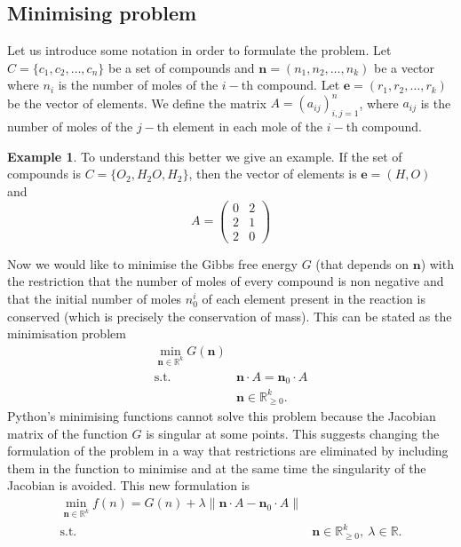 \documentclass[a4paper,10pt]{article}
\newcommand{\bm}{\boldsymbol}
\newcommand{\mR}{{\mathbb R}}
\theoremstyle{plain}
\theoremstyle{definition}
\newtheorem{ex}{Example}[section]
\theoremstyle{remark}
\begin{document}
\subsection{Minimising problem}
Let us introduce some notation in order to formulate the problem. Let $C = \{c_1,c_2,\dots,c_n\} $ be a set of compounds and $\bm n=(n_1,n_2,\dots,n_k)$ be a vector where $n_i$ is the number of moles of the $i-$th compound. Let $\bm e= (r_1,r_2,\dots,r_k)$ be the vector of elements. We define the matrix $A=(a_{ij})_{i,j=1}^n$, where $a_{ij}$ is the number of moles of the $j-$th element in each mole of the $i-$th compound.
\begin{ex}
To understand this better we give an example. If the set of compounds is $C = \{O_2,H_2O,H_2\}$, then the vector of elements is $\bm e = (H,O)$ and
\begin{equation*}
A = \begin{pmatrix}0&2\\ 2&1\\ 2&0
\end{pmatrix}
\end{equation*}
\end{ex}
Now we would like to minimise the Gibbs free energy $G$ (that depends on $\bm n$) with the restriction that the number of moles of every compound is non negative and that the initial number of moles $n_0^i$ of each element present in the reaction is conserved (which is precisely the conservation of mass). This can be stated as the minimisation problem
\begin{equation*}
\begin{array}{ll}
\displaystyle\min_{\bm n\in\mR^k} G(\bm n)\\
\text{s.t.} & \bm n\cdot A = \bm n_0\cdot A\\
& \bm n\in\mR^k_{\geq0}.
\end{array}
\end{equation*}
Python's minimising functions cannot solve this problem because the Jacobian matrix of the function $G$ is singular at some points. This suggests changing the formulation of the problem in a way that restrictions are eliminated by including them in the function to minimise and at the same time the singularity of the Jacobian is avoided. This new formulation is
\begin{equation*}
\begin{array}{ll}
\displaystyle\min_{\bm n\in\mR^k} f(n) = G(n) + \lambda \lVert \bm n\cdot A - \bm n_0\cdot A \lVert\\
\text{s.t.} & \bm n\in\mR^k_{\geq0}, \ \lambda\in\mR.
\end{array}
\end{equation*}
\end{document}
